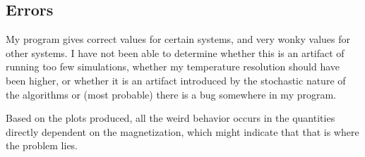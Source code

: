\subsection{Errors}
\label{sub:errors}

My program gives correct values for certain systems, and very wonky values for
other systems. I have not been able to determine whether this is an artifact of
running too few simulations, whether my temperature resolution should have been
higher, or whether it is an artifact introduced by the stochastic nature of the
algorithms or (most probable) there is a bug somewhere in my program.

Based on the plots produced, all the weird behavior occurs in the quantities
directly dependent on the magnetization, which might indicate that that is
where the problem lies.

